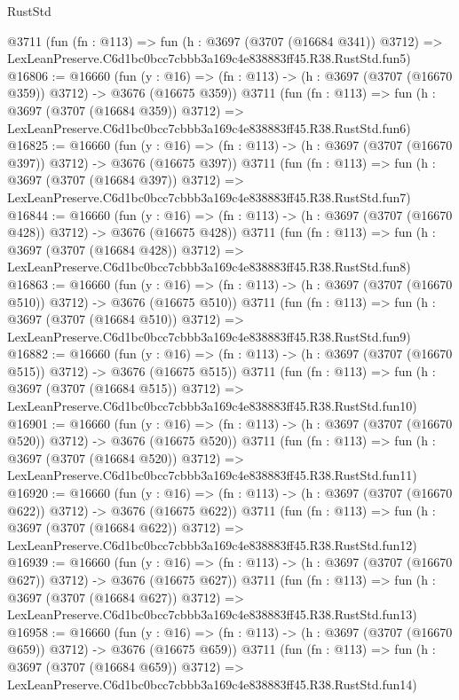 \begin{lexlean}{RustStd}
\begin{coremodule}
    @3711
    (fun (fn : @113) =>
    fun (h : @3697 (@3707 (@16684 @341)) @3712) =>
    LexLeanPreserve.C6d1bc0bcc7cbbb3a169c4e838883ff45.R38.RustStd.fun5)
@16806 := @16660
    (fun (y : @16) => (fn : @113) -> (h : @3697 (@3707 (@16670 @359)) @3712) -> @3676 (@16675 @359))
    @3711
    (fun (fn : @113) =>
    fun (h : @3697 (@3707 (@16684 @359)) @3712) =>
    LexLeanPreserve.C6d1bc0bcc7cbbb3a169c4e838883ff45.R38.RustStd.fun6)
@16825 := @16660
    (fun (y : @16) => (fn : @113) -> (h : @3697 (@3707 (@16670 @397)) @3712) -> @3676 (@16675 @397))
    @3711
    (fun (fn : @113) =>
    fun (h : @3697 (@3707 (@16684 @397)) @3712) =>
    LexLeanPreserve.C6d1bc0bcc7cbbb3a169c4e838883ff45.R38.RustStd.fun7)
@16844 := @16660
    (fun (y : @16) => (fn : @113) -> (h : @3697 (@3707 (@16670 @428)) @3712) -> @3676 (@16675 @428))
    @3711
    (fun (fn : @113) =>
    fun (h : @3697 (@3707 (@16684 @428)) @3712) =>
    LexLeanPreserve.C6d1bc0bcc7cbbb3a169c4e838883ff45.R38.RustStd.fun8)
@16863 := @16660
    (fun (y : @16) => (fn : @113) -> (h : @3697 (@3707 (@16670 @510)) @3712) -> @3676 (@16675 @510))
    @3711
    (fun (fn : @113) =>
    fun (h : @3697 (@3707 (@16684 @510)) @3712) =>
    LexLeanPreserve.C6d1bc0bcc7cbbb3a169c4e838883ff45.R38.RustStd.fun9)
@16882 := @16660
    (fun (y : @16) => (fn : @113) -> (h : @3697 (@3707 (@16670 @515)) @3712) -> @3676 (@16675 @515))
    @3711
    (fun (fn : @113) =>
    fun (h : @3697 (@3707 (@16684 @515)) @3712) =>
    LexLeanPreserve.C6d1bc0bcc7cbbb3a169c4e838883ff45.R38.RustStd.fun10)
@16901 := @16660
    (fun (y : @16) => (fn : @113) -> (h : @3697 (@3707 (@16670 @520)) @3712) -> @3676 (@16675 @520))
    @3711
    (fun (fn : @113) =>
    fun (h : @3697 (@3707 (@16684 @520)) @3712) =>
    LexLeanPreserve.C6d1bc0bcc7cbbb3a169c4e838883ff45.R38.RustStd.fun11)
@16920 := @16660
    (fun (y : @16) => (fn : @113) -> (h : @3697 (@3707 (@16670 @622)) @3712) -> @3676 (@16675 @622))
    @3711
    (fun (fn : @113) =>
    fun (h : @3697 (@3707 (@16684 @622)) @3712) =>
    LexLeanPreserve.C6d1bc0bcc7cbbb3a169c4e838883ff45.R38.RustStd.fun12)
@16939 := @16660
    (fun (y : @16) => (fn : @113) -> (h : @3697 (@3707 (@16670 @627)) @3712) -> @3676 (@16675 @627))
    @3711
    (fun (fn : @113) =>
    fun (h : @3697 (@3707 (@16684 @627)) @3712) =>
    LexLeanPreserve.C6d1bc0bcc7cbbb3a169c4e838883ff45.R38.RustStd.fun13)
@16958 := @16660
    (fun (y : @16) => (fn : @113) -> (h : @3697 (@3707 (@16670 @659)) @3712) -> @3676 (@16675 @659))
    @3711
    (fun (fn : @113) =>
    fun (h : @3697 (@3707 (@16684 @659)) @3712) =>
    LexLeanPreserve.C6d1bc0bcc7cbbb3a169c4e838883ff45.R38.RustStd.fun14)

\end{coremodule}
\end{lexlean}
